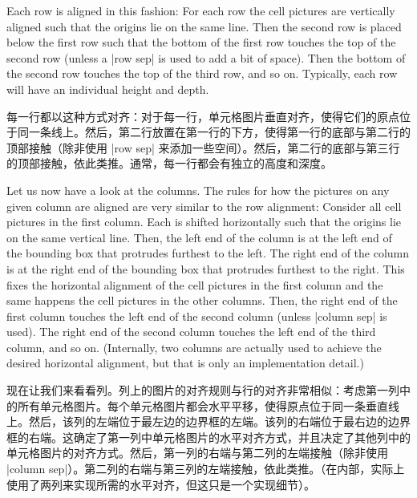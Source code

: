 Each row is aligned in this fashion: For each row the cell pictures
are vertically aligned such that the origins lie on the same
line. Then the second row is placed below the first row such that the
bottom of the first row touches the top of the second row (unless a
|row sep| is used to add a bit of space). Then the bottom of the
second row touches the top of the third row, and so on. Typically,
each row will have an individual height and depth.

每一行都以这种方式对齐：对于每一行，单元格图片垂直对齐，使得它们的原点位于同一条线上。然后，第二行放置在第一行的下方，使得第一行的底部与第二行的顶部接触（除非使用 |row sep| 来添加一些空间）。然后，第二行的底部与第三行的顶部接触，依此类推。通常，每一行都会有独立的高度和深度。
\begin{codeexample}[]
\end{codeexample}

Let us now have a look at the columns. The rules for how the pictures on any
given column are aligned are very similar to the row alignment: Consider all
cell pictures in the first column. Each is shifted horizontally such that the
origins lie on the same vertical line. Then, the left end of the column is at
the left end of the bounding box that protrudes furthest to the left. The right
end of the column is at the right end of the bounding box that protrudes
furthest to the right. This fixes the horizontal alignment of the cell pictures
in the first column and the same happens the cell pictures in the other
columns. Then, the right end of the first column touches the left end of the
second column (unless |column sep| is used). The right end of the second column
touches the left end of the third column, and so on. (Internally, two columns
are actually used to achieve the desired horizontal alignment, but that is only
an implementation detail.)

现在让我们来看看列。列上的图片的对齐规则与行的对齐非常相似：考虑第一列中的所有单元格图片。每个单元格图片都会水平平移，使得原点位于同一条垂直线上。然后，该列的左端位于最左边的边界框的左端。该列的右端位于最右边的边界框的右端。这确定了第一列中单元格图片的水平对齐方式，并且决定了其他列中的单元格图片的对齐方式。然后，第一列的右端与第二列的左端接触（除非使用 |column sep|）。第二列的右端与第三列的左端接触，依此类推。（在内部，实际上使用了两列来实现所需的水平对齐，但这只是一个实现细节）。


